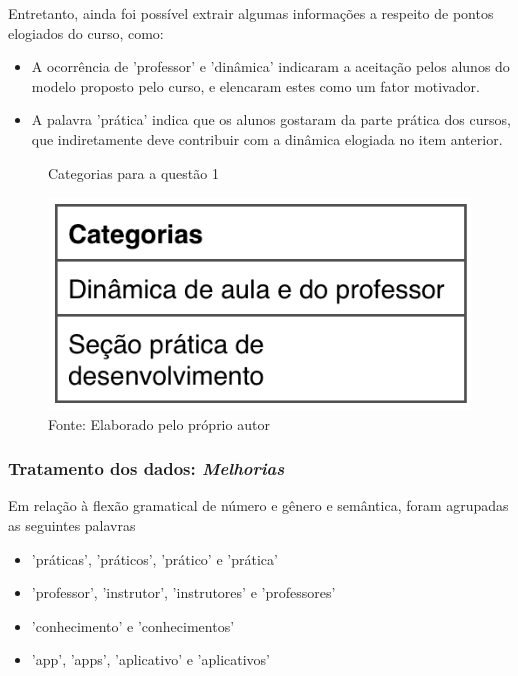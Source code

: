Entretanto, ainda foi possível extrair algumas informações a respeito de pontos elogiados do curso, como:

\begin{itemize}
\item A ocorrência de 'professor' e 'dinâmica' indicaram a aceitação pelos alunos do modelo proposto pelo curso, e elencaram estes como um fator motivador.
\item A palavra 'prática' indica que os alunos gostaram da parte prática dos cursos, que indiretamente deve contribuir com a dinâmica elogiada no item anterior.
\end{itemize}

\begin{figure}[H]
\caption{Categorias para a questão 1}
\centerline{\includegraphics[scale=0.75]{img/categoriasmotivacao}}
\label{fig:categoriasmotivacao}
\caption* {Fonte: Elaborado pelo próprio autor}
\end{figure}

\subsubsection*{Tratamento dos dados: \textit{Melhorias}}

Em relação à flexão gramatical de número e gênero e semântica, foram agrupadas as seguintes palavras

\begin{itemize}
\item 'práticas', 'práticos', 'prático' e 'prática'
\item 'professor', 'instrutor', 'instrutores' e 'professores'
\item 'conhecimento' e 'conhecimentos'
\item 'app', 'apps', 'aplicativo' e 'aplicativos'
\end{itemize}



